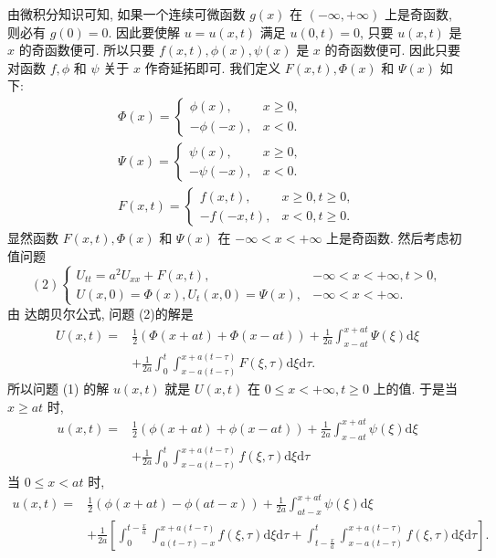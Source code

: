由微积分知识可知, 如果一个连续可微函数 $ g(x) $ 在 $ (-\infty,+\infty) $ 上是奇函数, 则必有 $ g(0)=0 $. 因此要使解 $ u=u(x, t) $ 满足 $ u(0, t)=0 $, 只要 $ u(x, t) $ 是 $ x $ 的奇函数便可. 所以只要 $ f(x, t), \phi(x), \psi(x) $ 是 $ x $ 的奇函数便可. 因此只要对函数 $ f, \phi $ 和 $ \psi $ 关于 $ x $ 作奇延拓即可. 我们定义 $ F(x, t), \Phi(x) $ 和 $ \Psi(x) $ 如下:
$$
\begin{array}{l}
\Phi(x)=\left\{\begin{array}{ll}
\phi(x), & x \geqslant 0, \\
-\phi(-x), & x<0 .
\end{array}\right. \\
\Psi(x)=\left\{\begin{array}{ll}
\psi(x), & x \geqslant 0, \\
-\psi(-x), & x<0 .
\end{array}\right. \\
F(x, t)=\left\{\begin{array}{ll}
f(x, t), & x \geqslant 0, t \geqslant 0, \\
-f(-x, t), & x<0, t \geqslant 0 .
\end{array}\right.
\end{array}
$$
显然函数 $ F(x, t), \Phi(x) $ 和 $ \Psi(x) $ 在 $ -\infty<x<+\infty $ 上是奇函数. 然后考虑初值问题
$$
(2)\left\{\begin{array}{ll}
U_{t t}=a^{2} U_{x x}+F(x, t), & -\infty<x<+\infty, t>0, \\
U(x, 0)=\Phi(x), U_{t}(x, 0)=\Psi(x), & -\infty<x<+\infty .
\end{array}\right.
$$
由 达朗贝尔公式, 问题 (2)的解是
$$
\begin{aligned}
U(x, t)= & \frac{1}{2}(\Phi(x+a t)+\Phi(x-a t))+\frac{1}{2 a} \int_{x-a t}^{x+a t} \Psi(\xi) \mathrm{d} \xi \\
& +\frac{1}{2 a} \int_{0}^{t} \int_{x-a(t-\tau)}^{x+a(t-\tau)} F(\xi, \tau) \mathrm{d} \xi \mathrm{d} \tau .
\end{aligned}
$$
所以问题 (1) 的解 $ u(x, t) $ 就是 $ U(x, t) $ 在 $ 0 \leqslant x<+\infty, t \geqslant 0 $ 上的值. 于是当$ x \geqslant a t $ 时,
$$
\begin{aligned}
u(x, t)= & \frac{1}{2}(\phi(x+a t)+\phi(x-a t))+\frac{1}{2 a} \int_{x-a t}^{x+a t} \psi(\xi) \mathrm{d} \xi \\
& +\frac{1}{2 a} \int_{0}^{t} \int_{x-a(t-\tau)}^{x+a(t-\tau)} f(\xi, \tau) \mathrm{d} \xi \mathrm{d} \tau
\end{aligned}
$$
当 $ 0 \leqslant x<a t $ 时,
$$
\begin{aligned}
u(x, t)= & \frac{1}{2}(\phi(x+a t)-\phi(a t-x))+\frac{1}{2 a} \int_{a t-x}^{x+a t} \psi(\xi) \mathrm{d} \xi \\
& +\frac{1}{2 a}\left[\int_{0}^{t-\frac{x}{a}} \int_{a(t-\tau)-x}^{x+a(t-\tau)} f(\xi, \tau) \mathrm{d} \xi \mathrm{d} \tau+\int_{t-\frac{x}{a}}^{t} \int_{x-a(t-\tau)}^{x+a(t-\tau)} f(\xi, \tau) \mathrm{d} \xi \mathrm{d} \tau\right] .
\end{aligned}
$$

